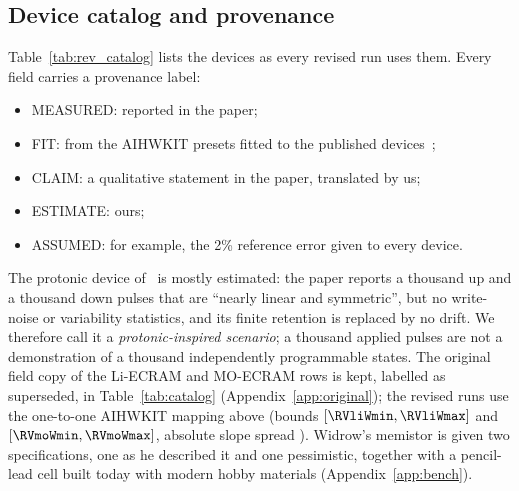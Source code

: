 \subsection{Device catalog and provenance}\label{sec:catalog}
Table~\ref{tab:rev_catalog} lists the devices as every revised run uses them. Every field carries a provenance label:
\begin{itemize}
\item MEASURED: reported in the paper;
\item FIT: from the AIHWKIT presets fitted to the published devices~\cite{rasch2021aihwkit};
\item CLAIM: a qualitative statement in the paper, translated by us;
\item ESTIMATE: ours;
\item ASSUMED: for example, the 2\% reference error given to every device.
\end{itemize}
The protonic device of~\cite{onen2022} is mostly estimated: the paper reports a thousand up and a thousand down pulses that are
``nearly linear and symmetric'', but no write-noise or variability statistics, and its finite retention is replaced by no
drift. We therefore call it a \emph{protonic-inspired scenario}; a thousand applied pulses are not a demonstration of a
thousand independently programmable states. The original field copy of the Li-ECRAM and MO-ECRAM
rows is kept, labelled as superseded, in Table~\ref{tab:catalog} (Appendix~\ref{app:original}); the revised runs use the one-to-one AIHWKIT mapping above (bounds $[\RVliWmin, \RVliWmax]$ and $[\RVmoWmin, \RVmoWmax]$,
absolute slope spread \RVliGammaDtod). Widrow's memistor is given two specifications,
one as he described it and one pessimistic, together with a pencil-lead cell built today with modern hobby materials
(Appendix~\ref{app:bench}).



